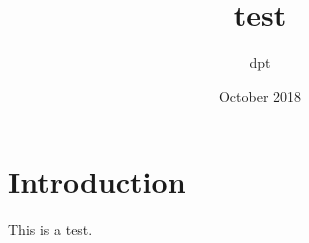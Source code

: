 \documentclass{article}
\title{test}
\author{dpt }
\date{October 2018}
\begin{document}
\maketitle

\section{Introduction}
This is a test.
\end{document}
